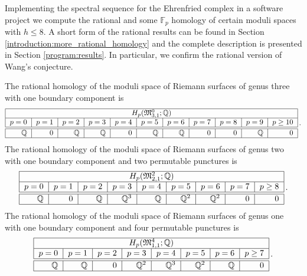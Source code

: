 Implementing the spectral sequence for the Ehrenfried complex in a software project we compute the rational and some $\mathbb F_p$ homology of certain moduli spaces with $h \le 8$.
A short form of the rational results can be found in Section \ref{introduction:more_rational_homology} and
the complete description is presented in Section \ref{program:results}.
In particular, we confirm the rational version of Wang's conjecture.
\begin{thm*}[Bödigheimer, B., H.]
    The rational homology of the moduli space of Riemann surfaces of genus three with one boundary component is
    \[
        \begin{tabular}{|r|r|r|r|r|r|r|r|r|r|r|}
            \hline
            \multicolumn{11}{|c|}{$H_p( \mathfrak{M}_{3,1}^0; \mathbb Q )$} \\ \hline
            $p=0$&$p=1$&$p=2$&$p=3$&$p=4$&$p=5$&$p=6$&$p=7$&$p=8$&$p=9$&$p\ge10$\\ \hline \hline
            $\mathbb Q$&$0$&$\mathbb Q$&$\mathbb Q$&$0$&$\mathbb Q$&$\mathbb Q$&$0$&$0$&$\mathbb Q$&$0$\\ \hline
        \end{tabular}\,.
    \]
    The rational homology of the moduli space of Riemann surfaces of genus two with one boundary component and two permutable punctures is
    \[
        \begin{tabular}{|r|r|r|r|r|r|r|r|r|}
            \hline
            \multicolumn{9}{|c|}{$H_p( \mathfrak{M}_{2,1}^2; \mathbb Q )$} \\ \hline
            $p=0$&$p=1$&$p=2$&$p=3$&$p=4$&$p=5$&$p=6$&$p=7$&$p\ge8$\\ \hline \hline
            $\mathbb Q$&$0$&$\mathbb Q$&$\mathbb Q^3$&$\mathbb Q$&$\mathbb Q^2$&$\mathbb Q^2$&$0$&$0$\\ \hline
        \end{tabular}\,.
    \]
    The rational homology of the moduli space of Riemann surfaces of genus one with one boundary component and four permutable punctures is
    \[
        \begin{tabular}{|r|r|r|r|r|r|r|r|}
            \hline
            \multicolumn{8}{|c|}{$H_p( \mathfrak{M}_{1,1}^4; \mathbb Q )$} \\ \hline
            $p=0$&$p=1$&$p=2$&$p=3$&$p=4$&$p=5$&$p=6$&$p\ge7$\\ \hline \hline
            $\mathbb Q$&$\mathbb Q$&$0$&$\mathbb Q^2$&$\mathbb Q^3$&$\mathbb Q^2$&$\mathbb Q$&$0$\\ \hline
        \end{tabular}\,.
    \]
\end{thm*}

